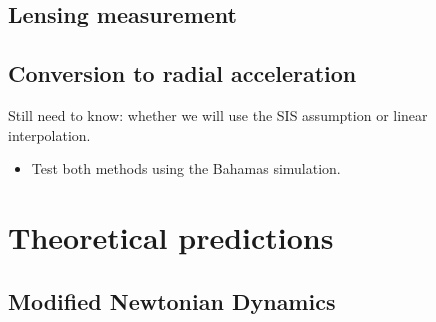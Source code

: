 \documentclass[fleqn,usenatbib]{mnras}
\begin{document}
\subsection{Lensing measurement}
\label{sec:lensing}




\subsection{Conversion to radial acceleration}
\label{sec:conversion}
Still need to know: whether we will use the SIS assumption or linear interpolation.
\begin{itemize}
	\item Test both methods using the Bahamas simulation.
\end{itemize}
	
\section{Theoretical predictions}
\label{sec:predictions}

\subsection{Modified Newtonian Dynamics}
\label{sec:MOND}
\end{document}
